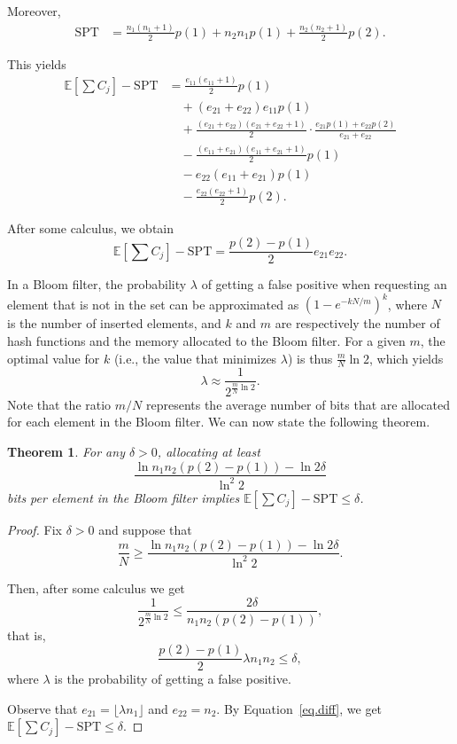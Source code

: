 \documentclass{article}
\newtheorem{theorem}{Theorem}
\newcommand{\E}{\mathbb{E}}
\begin{document}
Moreover,
\begin{align*}
    \text{SPT}
    &=\frac{n_1(n_1+1)}{2}p(1)+n_2n_1p(1)+\frac{n_2(n_2+1)}{2}p(2).
\end{align*}

This yields
\begin{align*}
    \E\left[\sum C_j\right]-\text{SPT}
    &=\frac{e_{11}(e_{11}+1)}{2}p(1)\\
    &\quad+(e_{21}+e_{22})e_{11}p(1)\\
    &\quad+\frac{(e_{21}+e_{22})(e_{21}+e_{22}+1)}{2}\cdot \frac{e_{21}p(1)+e_{22}p(2)}{e_{21}+e_{22}}\\
    &\quad-\frac{(e_{11}+e_{21})(e_{11}+e_{21}+1)}{2}p(1)\\
    &\quad-e_{22}(e_{11}+e_{21})p(1)\\
    &\quad-\frac{e_{22}(e_{22}+1)}{2}p(2).
\end{align*}

After some calculus, we obtain
\begin{equation}
    \label{eq.diff}
    \E\left[\sum C_j\right]-\text{SPT}=\frac{p(2)-p(1)}{2}e_{21}e_{22}.
\end{equation}

In a Bloom filter, the probability \(\lambda\) of getting a false positive when requesting an element that is not in the set can be approximated as \(\left(1-e^{-kN/m}\right)^k\), where \(N\) is the number of inserted elements, and \(k\) and \(m\) are respectively the number of hash functions and the memory allocated to the Bloom filter.
For a given \(m\), the optimal value for \(k\) (i.e., the value that minimizes \(\lambda\)) is thus \(\frac{m}{N}\ln 2\), which yields
\[
    \lambda\approx\frac{1}{2^{\frac{m}{N}\ln 2}}.
\]
Note that the ratio \(m/N\) represents the average number of bits that are allocated for each element in the Bloom filter.
We can now state the following theorem.

\begin{theorem}
    For any \(\delta>0\), allocating at least
    \[
        \frac{\ln n_1n_2(p(2)-p(1))-\ln 2\delta}{\ln^2 2}
    \]
    bits per element in the Bloom filter implies \(\E\left[\sum C_j\right]-\text{SPT}\le\delta\).
\end{theorem}
\begin{proof}
    Fix \(\delta>0\) and suppose that
    \[
        \frac{m}{N}\ge\frac{\ln n_1n_2(p(2)-p(1))-\ln 2\delta}{\ln^2 2}.
    \]

    Then, after some calculus we get
    \[
        \frac{1}{2^{\frac{m}{N}\ln 2}}\le\frac{2\delta}{n_1n_2(p(2)-p(1))},
    \]
    that is,
    \[
        \frac{p(2)-p(1)}{2}\lambda n_1n_2\le\delta,
    \]
    where \(\lambda\) is the probability of getting a false positive.

    Observe that \(e_{21}=\lfloor\lambda n_1\rfloor\) and \(e_{22}=n_2\).
    By Equation~\eqref{eq.diff}, we get \(\E\left[\sum C_j\right]-\text{SPT}\le\delta\).
\end{proof}
\end{document}
